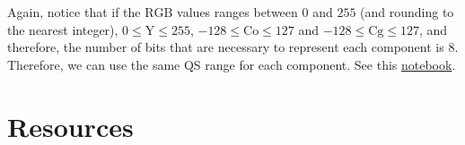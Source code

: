 Again, notice that if the $\text{RGB}$ values ranges between $0$
and $255$ (and rounding to the nearest integer), $0\le\text{Y}\le 255$,
$-128\le\text{Co}\le 127$ and $-128\le\text{Cg}\le 127$, and
therefore, the number of bits that are necessary to represent each
component is $8$. Therefore, we can use the same QS range for each
component. See this \href{https://github.com/Sistemas-Multimedia/Sistemas-Multimedia.github.io/blob/master/milestones/06-YUV_compression/YCrCb_matrix.ipynb}{notebook}.


\section{Resources}
\renewcommand{\addcontentsline}[3]{}%

